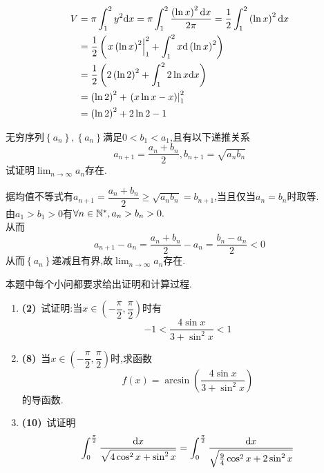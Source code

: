 \documentclass{ctexart}
\begin{document}
\begin{solution}[Solution.]
    \begin{align*}
        V
        &= \pi\int_1^2{y^2\mathrm{d} x}=\pi\int_1^2{\dfrac{\left(\ln x\right)^2\mathrm{d} x}{2\pi}}=\dfrac{1}{2}\int_1^2\left(\ln x\right)^2\mathrm{d} x \\
        &= \dfrac{1}{2}\left(\left.x\left(\ln x\right)^2\right|_1^2+\int_1^2x\mathrm{d}\left(\ln x\right)^2\right) \\
        &= \dfrac{1}{2}\left(2\left(\ln 2\right)^2+\int_1^2 2\ln x\mathrm{d} x\right) \\
        &= \left(\ln 2\right)^2+\left.\left(x\ln x-x\right)\right|_1^2 \\
        &= \left(\ln 2\right)^2+2\ln2-1
    \end{align*}
\end{solution}
\begin{problem}[7.(10\songti{分})]
    无穷序列$\left\{a_n\right\},\left\{a_n\right\}$满足$0<b_1<a_1$,且有以下递推关系$$a_{n+1}=\dfrac{a_n+b_n}{2},b_{n+1}=\sqrt{a_nb_n}$$试证明$\displaystyle\lim_{n\to\infty}{a_n}$存在.
\end{problem}
\begin{solution}[Proof.]
    据均值不等式有$a_{n+1}=\dfrac{a_n+b_n}{2}\geqslant\sqrt{a_nb_n}=b_{n+1}$,当且仅当$a_n=b_n$时取等.\\
    由$a_1>b_1>0$有$\forall n\in\mathbb{N}^*,a_n>b_n>0.$\\
    从而$$a_{n+1}-a_n=\dfrac{a_n+b_n}{2}-a_n=\dfrac{b_n-a_n}{2}<0$$
    从而$\left\{a_n\right\}$递减且有界,故$\displaystyle\lim_{n\to\infty}{a_n}$存在.
\end{solution}
\begin{problem}[8.(20\songti{分})]
    本题中每个小问都要求给出证明和计算过程.
        \begin{enumerate}[label=\textbf{(\arabic*)}]
            \item \textbf{(2)}\ 试证明:当$x\in\left(-\dfrac{\pi}{2},\dfrac{\pi}{2}\right)$时有$$-1<\dfrac{4\sin{x}}{3+\sin^2{x}}<1$$
            \item \textbf{(8)}\ 当$x\in\left(-\dfrac{\pi}{2},\dfrac{\pi}{2}\right)$时,求函数$$f(x)=\arcsin{\left(\dfrac{4\sin{x}}{3+\sin^2{x}}\right)}$$的导函数.
            \item \textbf{(10)}\ 试证明$$\int_{0}^{\frac{\pi}{2}}{\dfrac{\mathrm{d} x}{\sqrt{4\cos^2{x}+\sin^2{x}}}}=\int_{0}^{\frac{\pi}{2}}{\dfrac{\mathrm{d} x}{\sqrt{\frac{9}{4}\cos^2{x}+2\sin^2{x}}}}$$
        \end{enumerate}
\end{problem}
\end{document}
